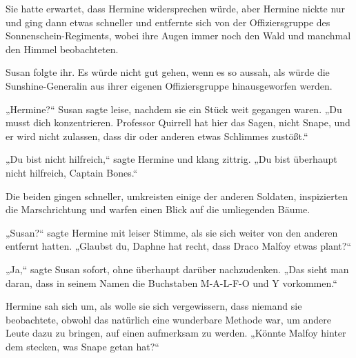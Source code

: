 Sie hatte erwartet, dass Hermine widersprechen würde, aber Hermine nickte nur und ging dann etwas schneller und entfernte sich von der Offiziersgruppe des Sonnenschein-Regiments, wobei ihre Augen immer noch den Wald und manchmal den Himmel beobachteten.

Susan folgte ihr. Es würde nicht gut gehen, wenn es so aussah, als würde die Sunshine-Generalin aus ihrer eigenen Offiziersgruppe hinausgeworfen werden.

„Hermine?“ Susan sagte leise, nachdem sie ein Stück weit gegangen waren. „Du musst dich konzentrieren. Professor Quirrell hat hier das Sagen, nicht Snape, und er wird nicht zulassen, dass dir oder anderen etwas Schlimmes zustößt.“

„Du bist nicht hilfreich,“ sagte Hermine und klang zittrig. „Du bist überhaupt nicht hilfreich, Captain Bones.“

Die beiden gingen schneller, umkreisten einige der anderen Soldaten, inspizierten die Marschrichtung und warfen einen Blick auf die umliegenden Bäume.

„Susan?“ sagte Hermine mit leiser Stimme, als sie sich weiter von den anderen entfernt hatten. „Glaubst du, Daphne hat recht, dass Draco Malfoy etwas plant?“

„Ja,“ sagte Susan sofort, ohne überhaupt darüber nachzudenken. „Das sieht man daran, dass in seinem Namen die Buchstaben M-A-L-F-O und Y vorkommen.“

Hermine sah sich um, als wolle sie sich vergewissern, dass niemand sie beobachtete, obwohl das natürlich eine wunderbare Methode war, um andere Leute dazu zu bringen, auf einen aufmerksam zu werden. „Könnte Malfoy hinter dem stecken, was Snape getan hat?“

